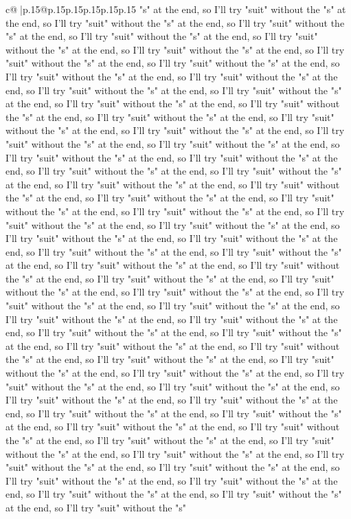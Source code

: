 \documentclass{article}
\begin{document}
{\begin{supertabular}{c@{$\;$}|p{.15\linewidth}@{}p{.15\linewidth}p{.15\linewidth}p{.15\linewidth}p{.15\linewidth}p{.15\linewidth}}
{{{"s" at the end, so I'll try "suit" without the "s" at the end, so I'll try "suit" without the "s" at the end, so I'll try "suit" without the "s" at the end, so I'll try "suit" without the "s" at the end, so I'll try "suit" without the "s" at the end, so I'll try "suit" without the "s" at the end, so I'll try "suit" without the "s" at the end, so I'll try "suit" without the "s" at the end, so I'll try "suit" without the "s" at the end, so I'll try "suit" without the "s" at the end, so I'll try "suit" without the "s" at the end, so I'll try "suit" without the "s" at the end, so I'll try "suit" without the "s" at the end, so I'll try "suit" without the "s" at the end, so I'll try "suit" without the "s" at the end, so I'll try "suit" without the "s" at the end, so I'll try "suit" without the "s" at the end, so I'll try "suit" without the "s" at the end, so I'll try "suit" without the "s" at the end, so I'll try "suit" without the "s" at the end, so I'll try "suit" without the "s" at the end, so I'll try "suit" without the "s" at the end, so I'll try "suit" without the "s" at the end, so I'll try "suit" without the "s" at the end, so I'll try "suit" without the "s" at the end, so I'll try "suit" without the "s" at the end, so I'll try "suit" without the "s" at the end, so I'll try "suit" without the "s" at the end, so I'll try "suit" without the "s" at the end, so I'll try "suit" without the "s" at the end, so I'll try "suit" without the "s" at the end, so I'll try "suit" without the "s" at the end, so I'll try "suit" without the "s" at the end, so I'll try "suit" without the "s" at the end, so I'll try "suit" without the "s" at the end, so I'll try "suit" without the "s" at the end, so I'll try "suit" without the "s" at the end, so I'll try "suit" without the "s" at the end, so I'll try "suit" without the "s" at the end, so I'll try "suit" without the "s" at the end, so I'll try "suit" without the "s" at the end, so I'll try "suit" without the "s" at the end, so I'll try "suit" without the "s" at the end, so I'll try "suit" without the "s" at the end, so I'll try "suit" without the "s" at the end, so I'll try "suit" without the "s" at the end, so I'll try "suit" without the "s" at the end, so I'll try "suit" without the "s" at the end, so I'll try "suit" without the "s" at the end, so I'll try "suit" without the "s" at the end, so I'll try "suit" without the "s" at the end, so I'll try "suit" without the "s" at the end, so I'll try "suit" without the "s" at the end, so I'll try "suit" without the "s" at the end, so I'll try "suit" without the "s" at the end, so I'll try "suit" without the "s" at the end, so I'll try "suit" without the "s" at the end, so I'll try "suit" without the "s" at the end, so I'll try "suit" without the "s" at the end, so I'll try "suit" without the "s" at the end, so I'll try "suit" without the "s" at the end, so I'll try "suit" without the "s" at the end, so I'll try "suit" without the "s" at the end, so I'll try "suit" without the "s" at the end, so I'll try "suit" without the "s" at the end, so I'll try "suit" without the "s" at the end, so I'll try "suit" without the "s" at the end, so I'll try "suit" without the "s" }}}
\end{supertabular}}
\end{document}
